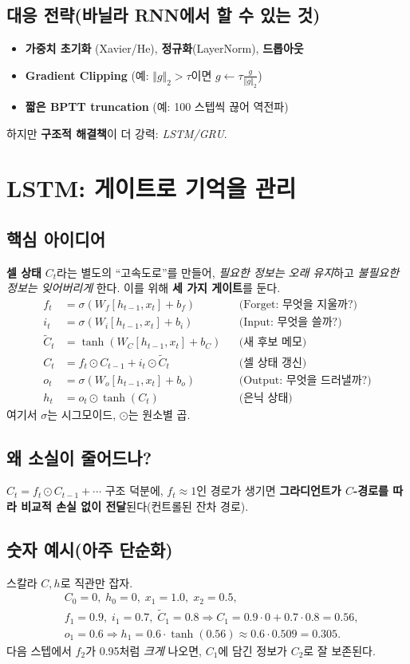 \documentclass[12pt]{article}
\begin{document}
\subsection{대응 전략(바닐라 RNN에서 할 수 있는 것)}
\begin{itemize}
  \item \textbf{가중치 초기화} (Xavier/He), \textbf{정규화}(LayerNorm), \textbf{드롭아웃}
  \item \textbf{Gradient Clipping} (예: $\Vert g\Vert_2 > \tau$이면 $g\leftarrow \tau\frac{g}{\Vert g\Vert_2}$)
  \item \textbf{짧은 BPTT truncation} (예: 100 스텝씩 끊어 역전파)
\end{itemize}
하지만 \textbf{구조적 해결책}이 더 강력: \emph{LSTM/GRU}.

\section{LSTM: 게이트로 기억을 관리}
\subsection{핵심 아이디어}
\textbf{셀 상태} $C_t$라는 별도의 ``고속도로''를 만들어, \emph{필요한 정보는 오래 유지}하고 \emph{불필요한 정보는 잊어버리게} 한다. 이를 위해 \textbf{세 가지 게이트}를 둔다.
\[
\begin{aligned}
f_t &= \sigma(W_f [h_{t-1}, x_t] + b_f) &&\text{(Forget: 무엇을 지울까?)}\\
i_t &= \sigma(W_i [h_{t-1}, x_t] + b_i) &&\text{(Input: 무엇을 쓸까?)}\\
\tilde{C}_t &= \tanh(W_C [h_{t-1}, x_t] + b_C) &&\text{(새 후보 메모)}\\
C_t &= f_t \odot C_{t-1} + i_t \odot \tilde{C}_t &&\text{(셀 상태 갱신)}\\
o_t &= \sigma(W_o [h_{t-1}, x_t] + b_o) &&\text{(Output: 무엇을 드러낼까?)}\\
h_t &= o_t \odot \tanh(C_t) &&\text{(은닉 상태)}
\end{aligned}
\]
여기서 $\sigma$는 시그모이드, $\odot$는 원소별 곱.

\subsection*{왜 소실이 줄어드나?}
$C_t = f_t\odot C_{t-1} + \cdots$ 구조 덕분에, $f_t\approx 1$인 경로가 생기면 \textbf{그라디언트가 $C$-경로를 따라 비교적 손실 없이 전달}된다(컨트롤된 잔차 경로).

\subsection{숫자 예시(아주 단순화)}
스칼라 $C, h$로 직관만 잡자.
\[
\begin{aligned}
&C_0=0,\; h_0=0,\; x_1=1.0,\; x_2=0.5,\\
&f_1=0.9,\; i_1=0.7,\; \tilde{C}_1=0.8 \Rightarrow C_1 = 0.9\cdot 0 + 0.7\cdot 0.8=0.56,\\
&o_1=0.6 \Rightarrow h_1 = 0.6\cdot \tanh(0.56)\approx 0.6\cdot 0.509=0.305.
\end{aligned}
\]
다음 스텝에서 $f_2$가 0.95처럼 \emph{크게} 나오면, $C_1$에 담긴 정보가 $C_2$로 잘 보존된다.
\end{document}
